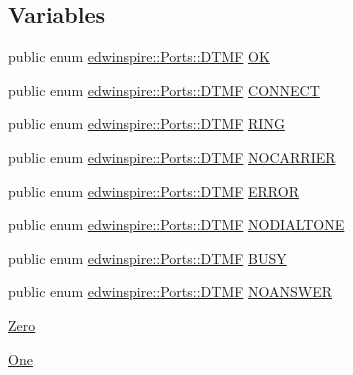 \subsection*{Variables}
\begin{DoxyCompactItemize}
\item 
public enum \hyperlink{namespaceedwinspire_1_1_ports_af4e0ec730b70610713b98825eb7c6f53}{edwinspire\-::\-Ports\-::\-D\-T\-M\-F} \hyperlink{namespaceedwinspire_1_1_ports_a1c098ccc8f7a4f8bd868fa4887872b4e}{O\-K}
\item 
public enum \hyperlink{namespaceedwinspire_1_1_ports_af4e0ec730b70610713b98825eb7c6f53}{edwinspire\-::\-Ports\-::\-D\-T\-M\-F} \hyperlink{namespaceedwinspire_1_1_ports_aff135858aa5a9cc89df1ab5c7be36d57}{C\-O\-N\-N\-E\-C\-T}
\item 
public enum \hyperlink{namespaceedwinspire_1_1_ports_af4e0ec730b70610713b98825eb7c6f53}{edwinspire\-::\-Ports\-::\-D\-T\-M\-F} \hyperlink{namespaceedwinspire_1_1_ports_a8de2369866bdfd3f0663a793d0e67255}{R\-I\-N\-G}
\item 
public enum \hyperlink{namespaceedwinspire_1_1_ports_af4e0ec730b70610713b98825eb7c6f53}{edwinspire\-::\-Ports\-::\-D\-T\-M\-F} \hyperlink{namespaceedwinspire_1_1_ports_ad4606903009920c6acc09144a51f91cf}{N\-O\-C\-A\-R\-R\-I\-E\-R}
\item 
public enum \hyperlink{namespaceedwinspire_1_1_ports_af4e0ec730b70610713b98825eb7c6f53}{edwinspire\-::\-Ports\-::\-D\-T\-M\-F} \hyperlink{namespaceedwinspire_1_1_ports_ab432ddd57eaa78866b8ce320fdb31d01}{E\-R\-R\-O\-R}
\item 
public enum \hyperlink{namespaceedwinspire_1_1_ports_af4e0ec730b70610713b98825eb7c6f53}{edwinspire\-::\-Ports\-::\-D\-T\-M\-F} \hyperlink{namespaceedwinspire_1_1_ports_aeeca1b6e1c383f62758a51f1307c8638}{N\-O\-D\-I\-A\-L\-T\-O\-N\-E}
\item 
public enum \hyperlink{namespaceedwinspire_1_1_ports_af4e0ec730b70610713b98825eb7c6f53}{edwinspire\-::\-Ports\-::\-D\-T\-M\-F} \hyperlink{namespaceedwinspire_1_1_ports_ab27d4ee5b5866641be5fde3f6c15719b}{B\-U\-S\-Y}
\item 
public enum \hyperlink{namespaceedwinspire_1_1_ports_af4e0ec730b70610713b98825eb7c6f53}{edwinspire\-::\-Ports\-::\-D\-T\-M\-F} \hyperlink{namespaceedwinspire_1_1_ports_a7b95c55cd0d61c0352039c017a0fe263}{N\-O\-A\-N\-S\-W\-E\-R}
\item 
\hyperlink{libspire__modem__new_8vala_ab7be4097d881eae846c441069ed51f24}{Zero}
\item 
\hyperlink{libspire__modem__new_8vala_a5fa00e7f98097a9c0c059b5308a4b863}{One}

\end{DoxyCompactItemize}

